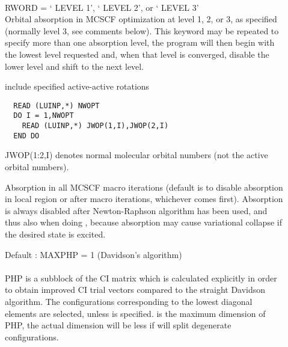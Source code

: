 \begin{description}
\item[]
   \\
  RWORD = ` LEVEL 1', ` LEVEL 2', or ` LEVEL 3'\\
  Orbital absorption in MCSCF optimization
  at level 1, 2, or 3, as specified
  (normally level 3, see comments below).  This keyword may be repeated to
  specify more than one absorption level, the program will then begin with
  the lowest level requested and, when that level is converged,
  disable the lower level and shift to the next level.

\item[]
  include specified active-active rotations
\begin{verbatim}
  READ (LUINP,*) NWOPT
  DO I = 1,NWOPT
    READ (LUINP,*) JWOP(1,I),JWOP(2,I)
  END DO
\end{verbatim}
  JWOP(1:2,I) denotes normal molecular orbital numbers (not the active
  orbital numbers).

\item[]
  Absorption in all MCSCF macro iterations
  (default is to disable absorption in
  local region or after  macro iterations, whichever comes first).
  Absorption is always disabled after Newton-Raphson algorithm has been used,
  and thus also when doing ,
  because absorption may cause variational collapse if the desired state is excited.

\item[]
  Default : MAXPHP = 1 (Davidson's algorithm)\\
   \\
  PHP is a subblock of the CI matrix which is calculated explicitly
  in order to obtain improved CI trial vectors compared to the
  straight Davidson algorithm.  The
  configurations corresponding to
  the lowest diagonal elements are selected, unless
   is specified.
   is the maximum dimension of PHP, the actual dimension
  will be less if  will split degenerate configurations.


\end{description}
